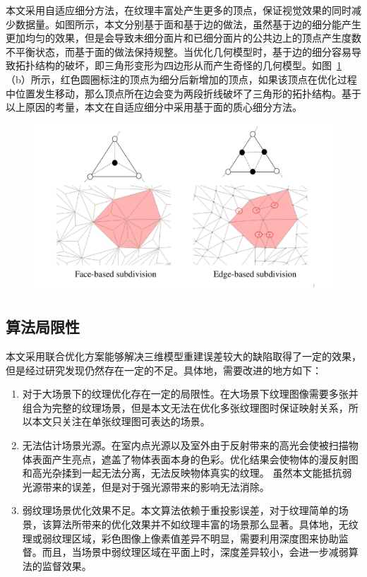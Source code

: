 本文采用自适应细分方法，在纹理丰富处产生更多的顶点，保证视觉效果的同时减少数据量。如图所示，本文分别基于面和基于边的做法，虽然基于边的细分能产生更加均匀的效果，但是会导致未细分面片和已细分面片的公共边上的顶点产生度数不平衡状态，而基于面的做法保持规整。当优化几何模型时，基于边的细分容易导致拓扑结构的破坏，即三角形变形为四边形从而产生奇怪的几何模型。如图~\ref{fig:Triangles}（b）所示，红色圆圈标注的顶点为细分后新增加的顶点，如果该顶点在优化过程中位置发生移动，那么顶点所在边会变为两段折线破坏了三角形的拓扑结构。基于以上原因的考量，本文在自适应细分中采用基于面的质心细分方法。
\begin{figure}[ht]
\centering
\includegraphics[width=1\linewidth]{pic/work2/Tri.pdf}
\label{fig:Triangles}
\end{figure}
\subsection{算法局限性}
本文采用联合优化方案能够解决三维模型重建误差较大的缺陷取得了一定的效果，但是经过研究发现仍然存在一定的不足。具体地，需要改进的地方如下：\par
\begin{enumerate}[label=(\arabic*),leftmargin=\parindent,align=left,labelwidth=\parindent,labelsep=0pt]
	\item 对于大场景下的纹理优化存在一定的局限性。在大场景下纹理图像需要多张并组合为完整的纹理场景，但是本文无法在优化多张纹理图时保证映射关系，所以本文只关注在单张纹理图可表达的场景。
	\item 无法估计场景光源。在室内点光源以及室外由于反射带来的高光会使被扫描物体表面产生亮点，遮盖了物体表面本身的色彩。优化结果会使物体的漫反射图和高光杂揉到一起无法分离，无法反映物体真实的纹理。 虽然本文能抵抗弱光源带来的误差，但是对于强光源带来的影响无法消除。
	\item 弱纹理场景优化效果不足。本文算法依赖于重投影误差，对于纹理简单的场景，该算法所带来的优化效果并不如纹理丰富的场景那么显著。具体地，无纹理或弱纹理区域，彩色图像上像素值差异不明显，需要利用深度图来协助监督。而且，当场景中弱纹理区域在平面上时，深度差异较小，会进一步减弱算法的监督效果。
\end{enumerate}

